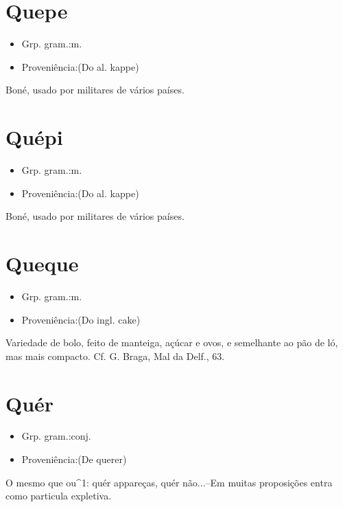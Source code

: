 \section{Quepe}
\begin{itemize}
\item {Grp. gram.:m.}
\end{itemize}
\begin{itemize}
\item {Proveniência:(Do al. \textunderscore kappe\textunderscore )}
\end{itemize}
Boné, usado por militares de vários países.
\section{Quépi}
\begin{itemize}
\item {Grp. gram.:m.}
\end{itemize}
\begin{itemize}
\item {Proveniência:(Do al. \textunderscore kappe\textunderscore )}
\end{itemize}
Boné, usado por militares de vários países.
\section{Queque}
\begin{itemize}
\item {Grp. gram.:m.}
\end{itemize}
\begin{itemize}
\item {Proveniência:(Do ingl. \textunderscore cake\textunderscore )}
\end{itemize}
Variedade de bolo, feito de manteiga, açúcar e ovos, e semelhante ao pão de ló, mas mais compacto. Cf. G. Braga, \textunderscore Mal da Delf.\textunderscore , 63.
\section{Quér}
\begin{itemize}
\item {Grp. gram.:conj.}
\end{itemize}
\begin{itemize}
\item {Proveniência:(De \textunderscore querer\textunderscore )}
\end{itemize}
O mesmo que \textunderscore ou\textunderscore ^1: \textunderscore quér appareças, quér não...\textunderscore --Em muitas proposições entra como particula expletiva.
